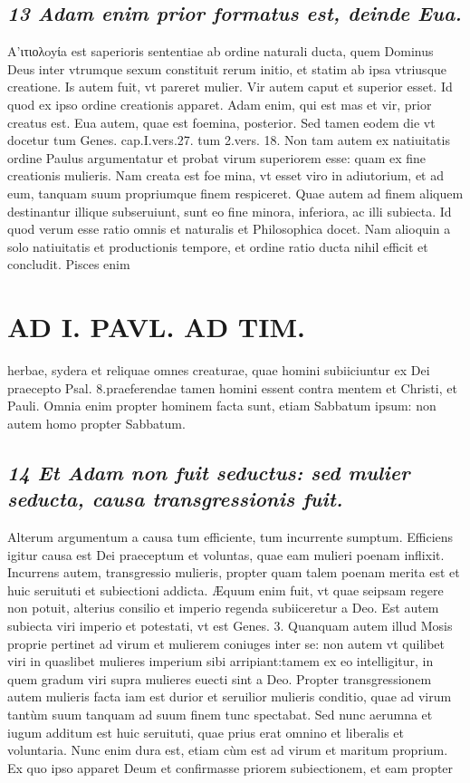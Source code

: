 \documentclass{article}
\begin{document}
\begin{pages}
\subsection*{\textit{13 Adam enim prior formatus est, deinde Eua. }}\pstart A’ιτιολoyίa est saperioris sententiae ab ordine naturali ducta, quem Dominus Deus inter vtrumque sexum constituit rerum initio, et statim ab ipsa vtriusque creatione. Is autem fuit, vt pareret mulier. Vir autem caput et superior esset. Id quod ex ipso ordine creationis apparet. Adam enim, qui est mas et vir, prior creatus est. Eua autem, quae est foemina, posterior. Sed tamen eodem die vt docetur tum Genes. cap.I.vers.27. tum 2.vers. 18. Non tam autem ex natiuitatis ordine Paulus argumentatur et probat virum superiorem esse: quam ex fine creationis mulieris. Nam creata est foe mina, vt esset viro in adiutorium, et ad eum, tanquam suum propriumque finem respiceret. Quae autem ad finem aliquem destinantur illique  subseruiunt, sunt eo fine minora, inferiora, ac illi subiecta. Id quod verum esse ratio omnis et naturalis et Philosophica docet. Nam alioquin a solo natiuitatis et productionis tempore, et ordine ratio ducta nihil efficit et concludit. Pisces enim  \pend
\section*{AD I. PAVL. AD TIM. }
\marginpar{[ p.88 ]}\pstart herbae, sydera et reliquae omnes creaturae, quae homini subiiciuntur ex Dei praecepto Psal. 8.praeferendae tamen homini essent contra mentem et Christi, et Pauli. Omnia enim propter hominem facta sunt, etiam Sabbatum ipsum: non autem homo propter Sabbatum.  \pend
{}
{}
\subsection*{\textit{14 Et Adam non fuit seductus: sed mulier seducta, causa transgressionis fuit. }}\pstart Alterum argumentum a causa tum efficiente, tum incurrente sumptum. Efficiens igitur causa est Dei praeceptum et voluntas, quae eam mulieri poenam inflixit. Incurrens autem, transgressio mulieris, propter quam talem poenam merita est et huic seruituti et subiectioni addicta. Æquum enim fuit, vt quae seipsam regere non potuit, alterius consilio et imperio regenda subiiceretur a Deo. Est autem subiecta viri imperio et potestati, vt est Genes. 3. Quanquam autem illud Mosis proprie pertinet ad virum et mulierem coniuges inter se: non autem vt quilibet viri in quaslibet mulieres imperium sibi arripiant:tamem ex eo intelligitur, in quem gradum viri supra mulieres euecti sint a Deo. Propter transgressionem autem mulieris facta iam est durior et seruilior mulieris conditio, quae ad virum tantùm suum tanquam ad suum finem tunc spectabat. Sed nunc aerumna et iugum additum est huic seruituti, quae prius erat omnino et liberalis et voluntaria. Nunc enim dura est, etiam cùm est ad virum et maritum proprium. Ex quo ipso apparet Deum et confirmasse priorem subiectionem, et eam propter  \pend

\end{pages}
\end{document}
